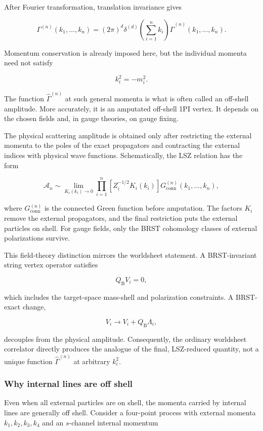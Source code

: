\documentclass[
  10pt,
  a4paper,
  openany]{book}
\begin{document}
After Fourier transformation, translation invariance gives

\[
\Gamma^{(n)}(k_1,\ldots,k_n)
=(2\pi)^d\delta^{(d)}\!\left(\sum_{i=1}^n k_i\right)
\widehat\Gamma^{(n)}(k_1,\ldots,k_n).
\]

Momentum conservation is already imposed here, but the individual
momenta need not satisfy

\[
k_i^2=-m_i^2.
\]

The function \(\widehat\Gamma^{(n)}\) at such general momenta is what is
often called an off-shell amplitude. More accurately, it is an amputated
off-shell 1PI vertex. It depends on the chosen fields and, in gauge
theories, on gauge fixing.

The physical scattering amplitude is obtained only after restricting the
external momenta to the poles of the exact propagators and contracting
the external indices with physical wave functions. Schematically, the
LSZ relation has the form

\[
\mathcal A_n
\sim
\lim_{K_i(k_i)\to0}
\prod_{i=1}^n
\left[Z_i^{-1/2}K_i(k_i)\right]
G^{(n)}_{\mathrm{conn}}(k_1,\ldots,k_n),
\]

where \(G^{(n)}_{\mathrm{conn}}\) is the connected Green function before
amputation. The factors \(K_i\) remove the external propagators, and the
final restriction puts the external particles on shell. For gauge
fields, only the BRST cohomology classes of external polarizations
survive.

This field-theory distinction mirrors the worldsheet statement. A
BRST-invariant string vertex operator satisfies

\[
Q_{\mathrm B}V_i=0,
\]

which includes the target-space mass-shell and polarization constraints.
A BRST-exact change,

\[
V_i\longrightarrow V_i+Q_{\mathrm B}\Lambda_i,
\]

decouples from the physical amplitude. Consequently, the ordinary
worldsheet correlator directly produces the analogue of the final,
LSZ-reduced quantity, not a unique function \(\widehat\Gamma^{(n)}\) at
arbitrary \(k_i^2\).

\subsubsection{Why internal lines are off
shell}\label{why-internal-lines-are-off-shell}

Even when all external particles are on shell, the momenta carried by
internal lines are generally off shell. Consider a four-point process
with external momenta \(k_1,k_2,k_3,k_4\) and an \(s\)-channel internal
momentum
\end{document}

